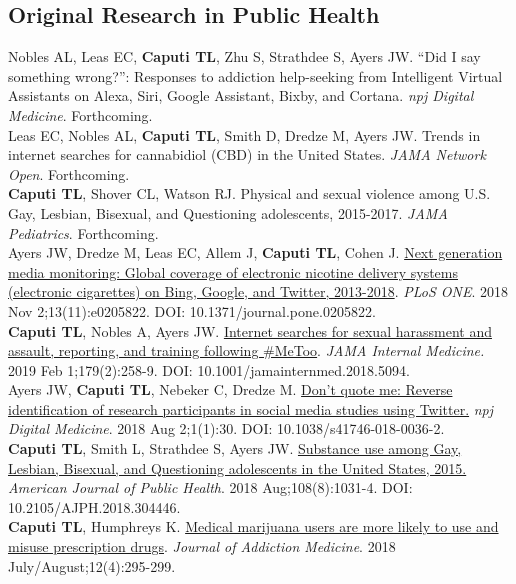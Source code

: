 \documentclass[11pt, letterpaper]{article}
\newcommand{\years}[1]{\marginnote{\normalsize #1}}
\begin{document}
\subsection*{Original Research in Public Health}
\noindent
\years{2019}Nobles AL, Leas EC, \textbf{Caputi TL}, Zhu S, Strathdee S, Ayers JW. “Did I say something wrong?”: Responses to addiction help-seeking from Intelligent Virtual Assistants on Alexa, Siri, Google Assistant, Bixby, and Cortana. \textit{npj Digital Medicine}. Forthcoming.\\[.2cm]
\years{2019}Leas EC, Nobles AL, \textbf{Caputi TL}, Smith D, Dredze M, Ayers JW. Trends in internet searches for cannabidiol (CBD) in the United States. \textit{JAMA Network Open}. Forthcoming.\\[.2cm]
\years{2019}\textbf{Caputi TL}, Shover CL, Watson RJ. Physical and sexual violence among U.S. Gay, Lesbian, Bisexual, and Questioning adolescents, 2015-2017. \textit{JAMA Pediatrics}. Forthcoming.\\[.2cm]
\years{2018}Ayers JW, Dredze M, Leas EC, Allem J, \textbf{Caputi TL},  Cohen J. \href{https://dx.doi.org/10.1371/journal.pone.0205822}{Next generation media monitoring: Global coverage of electronic nicotine delivery systems (electronic cigarettes) on Bing, Google, and Twitter, 2013-2018}. \textit{PLoS ONE}. 2018 Nov 2;13(11):e0205822. DOI: 10.1371/journal.pone.0205822.\\[.2cm]
\years{2018}\textbf{Caputi TL}, Nobles A, Ayers JW. \href{https://dx.doi.org/10.1001/jamainternmed.2018.5094}{Internet searches for sexual harassment and assault, reporting, and training following \#MeToo}. \textit{JAMA Internal Medicine.} 2019 Feb 1;179(2):258-9. DOI: 10.1001/jamainternmed.2018.5094.\\[.2cm]
\years{2018}Ayers JW, \textbf{Caputi TL}, Nebeker C, Dredze M. \href{https://dx.doi.org/10.1038/s41746-018-0036-2}{Don't quote me: Reverse identification of research participants in social media studies using Twitter.} \textit{npj Digital Medicine}. 2018 Aug 2;1(1):30. DOI: 10.1038/s41746-018-0036-2.\\[.2cm]
\years{2018}\textbf{Caputi TL}, Smith L, Strathdee S, Ayers JW. \href{http://dx.doi.org/10.2105/AJPH.2018.304446}{Substance use among Gay, Lesbian, Bisexual, and Questioning adolescents in the United States, 2015.} \textit{American Journal of Public Health}. 2018 Aug;108(8):1031-4. DOI: 10.2105/AJPH.2018.304446.\\[.2cm]
\years{2018}\textbf{Caputi TL}, Humphreys K. \href{http://dx.doi.org/10.1097/ADM.0000000000000405}{Medical marijuana users are more likely to use and misuse prescription drugs}.  \textit{Journal of Addiction Medicine}. 2018 July/August;12(4):295-299. \\
\end{document}
